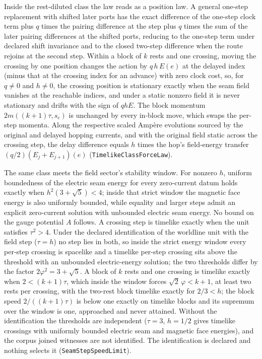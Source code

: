 \documentclass[11pt]{article}
\begin{document}
Inside the rest-diluted class the law reads as a position law. A general
one-step replacement with shifted later ports has the exact difference of
the one-step clock term plus \(q\) times the pairing difference at the step
plus \(q\) times the sum of the later pairing differences at the shifted
ports, reducing to the one-step term under declared shift invariance and
to the closed two-step difference when the route rejoins at the second
step. Within a block of \(k\) rests and one crossing, moving the crossing
by one position changes the action by \(q\,h\,E(e)\) at the delayed index
(minus that at the crossing index for an advance) with zero clock cost, so,
for \(q\ne0\) and \(h\ne0\), the crossing position is stationary exactly
when the seam field vanishes at the reachable indices, and under a static
nonzero field it is never stationary and drifts with the sign of \(qhE\). The
block momentum
\(2m((k+1)\tau,s_e)\) is unchanged by every in-block move, which swaps the
per-step momenta. Along the respective scaled Amp\`ere evolutions sourced by
the original and delayed hopping currents, and with the original field static
across the crossing step, the delay difference equals \(h\) times the hop's field-energy transfer
\((q/2)(E_j+E_{j+1})(e)\) (\texttt{TimelikeClassForceLaw}).

The same class meets the field sector's stability window. For nonzero \(h\),
uniform boundedness of the electric seam energy for every zero-current datum
holds exactly when \(h^2(3+\sqrt5)<4\); inside that strict window the magnetic
face energy is also uniformly bounded, while equality and larger steps admit
an explicit zero-current solution with unbounded electric seam energy. No
bound on the gauge potential \(A\) follows. A
crossing step is timelike exactly when the unit satisfies \(\tau^2>4\).
Under the declared identification of the worldline unit with the field step
(\(\tau=h\)) no step lies in both, so inside the strict energy window every
per-step crossing is spacelike and a timelike per-step crossing sits above
the threshold with an unbounded electric-energy solution; the two thresholds differ by the
factor \(2\varphi^2=3+\sqrt5\). A block of \(k\) rests and one crossing is
timelike exactly when \(2<(k+1)\tau\), which inside the window forces
\(\sqrt2\,\varphi<k+1\), at least two rests per crossing, with the two-rest
block timelike exactly for \(2/3<h\); the block speed \(2/((k+1)\tau)\) is
below one exactly on timelike blocks and its supremum over the window is one,
approached and never attained. Without the identification the thresholds are
independent (\(\tau=3\), \(h=1/2\) gives timelike crossings with uniformly
bounded electric seam and magnetic face energies), and the corpus joined
witnesses are not identified. The
identification is declared and nothing selects it
(\texttt{SeamStepSpeedLimit}).
\end{document}
